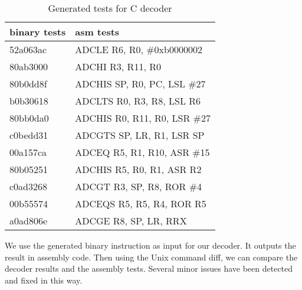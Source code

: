 \begin{table}[h]
  \centering
  \begin{tabular}{|l|l@{~}|}
    \hline
    binary tests & asm tests\\
    \hline
    52a063ac & ADCLE	R6, R0, \#0xb0000002\\
    80ab3000 & ADCHI	R3, R11, R0\\
    80b0dd8f & ADCHIS	SP, R0, PC, LSL \#27\\
    b0b30618 & ADCLTS	R0, R3, R8, LSL R6\\
    80bb0da0 & ADCHIS	R0, R11, R0, LSR \#27\\
    c0bedd31 & ADCGTS	SP, LR, R1, LSR SP\\
    00a157ca & ADCEQ	R5, R1, R10, ASR \#15\\
    80b05251 & ADCHIS	R5, R0, R1, ASR R2\\
    c0ad3268 & ADCGT	R3, SP, R8, ROR \#4\\
    00b55574 & ADCEQS	R5, R5, R4, ROR R5\\
    a0ad806e & ADCGE	R8, SP, LR, RRX\\
    \hline
  \end{tabular}
  \caption{Generated tests for C decoder}
  \label{table:dectest}
\end{table}

We use the generated binary instruction as input for our decoder.
It outputs the result in assembly code.
Then using the Unix command {\stt diff}, we can compare the decoder
results and the assembly tests.
Several minor issues have been detected and fixed in this way.



